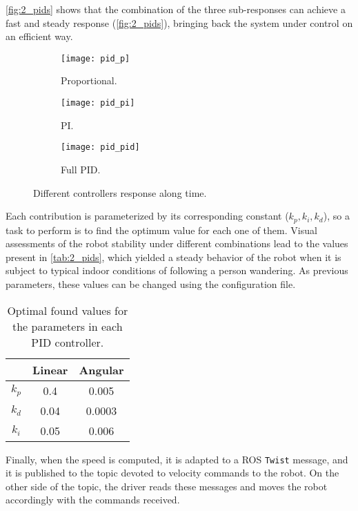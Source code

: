 \autoref{fig:2_pids} shows that the combination of the three sub-responses can achieve a fast and steady response (\autoref{fig:2_pids}), bringing back the system under control on an efficient way.

\begin{figure}[h]
	\centering
	\begin{subfigure}[b]{0.3\linewidth}
		\centering
		\texttt{[image: pid\_p]}
		\caption{Proportional.}
		\label{fig:2_pid_p}
	\end{subfigure}
	\hfill
	\begin{subfigure}[b]{0.3\linewidth}
		\centering
		\texttt{[image: pid\_pi]}
		\caption{PI.}
		\label{fig:2_pid_pi}
	\end{subfigure}
	\hfill
	\begin{subfigure}[b]{0.3\linewidth}
		\centering
		\texttt{[image: pid\_pid]}
		\caption{Full PID.}
		\label{fig:2_pid_pid}
	\end{subfigure}
	\caption{Different controllers response along time.}
	\label{fig:2_pids}		 	
\end{figure}

Each contribution is parameterized by its corresponding constant ($k_p, k_i, k_d$), so a task to perform is to find the optimum value for each one of them. Visual assessments of the robot stability under different combinations lead to the values present in \autoref{tab:2_pids}, which yielded a steady behavior of the robot when it is subject to typical indoor conditions of following a person wandering. As previous parameters, these values can be changed using the configuration file.

\begin{table}[h]
	\centering
	\begin{tabular}{|c|c|c|}
		\hline
		\textbf{} & \textbf{Linear} & \textbf{Angular} \\ \hline
		$k_p$     & 0.4               & 0.005               \\ \hline
		$k_d$     & 0.04              & 0.0003              \\ \hline
		$k_i$     & 0.05              & 0.006               \\ \hline
	\end{tabular}
	\caption{Optimal found values for the parameters in each PID controller.}
	\label{tab:2_pids}
\end{table}

Finally, when the speed is computed, it is adapted to a ROS \texttt{Twist} message, and it is published to the topic devoted to velocity commands to the robot. On the other side of the topic, the driver reads these messages and moves the robot accordingly with the commands received.\\

